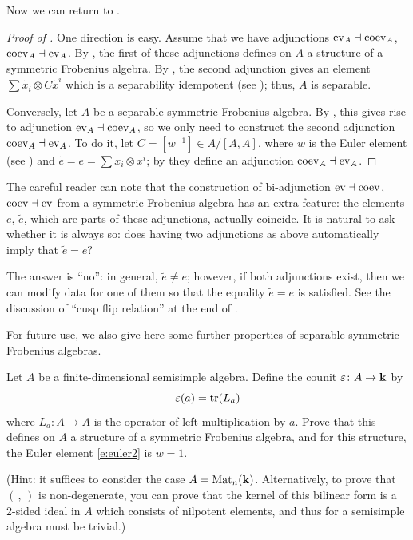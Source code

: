 Now we can return to .

\begin{proof}[Proof of ]
  One direction is easy. Assume that we have adjunctions $\operatorname{ev}_A\dashv\operatorname{coev}_A$,
  $\operatorname{coev}_A\dashv\operatorname{ev}_A$. By , the first of these
  adjunctions defines on $A$ a structure of a symmetric Frobenius algebra. By
  , the second adjunction gives an element $\sum
  \tilde x_i \otimes C\tilde x^i$ which is a separability idempotent (see
  ); thus, $A$ is separable.

  Conversely, let $A$ be a separable symmetric Frobenius algebra. By
  , this gives rise to adjunction $\operatorname{ev}_A\dashv\operatorname{coev}_A$,
  so we only need to construct the second adjunction $\operatorname{coev}_A\dashv\operatorname{ev}_A$. To do
  it, let $C=[w^{-1}]\in A/[A,A]$, where $w$ is the Euler element (see
  ) and $\tilde e=e =\sum x_i \otimes x^i$; by
   they define an adjunction $\operatorname{coev}_A\dashv
  \operatorname{ev}_A$.
\end{proof}
\begin{remark}
  The careful reader can note that the construction of bi-adjunction
  $\operatorname{ev}\dashv\operatorname{coev}$, $\operatorname{coev}\dashv\operatorname{ev}$ from a symmetric Frobenius algebra has an
  extra feature: the elements $e$, $\tilde e$, which are parts of these
  adjunctions, actually coincide. It is natural to ask whether it is always so:
  does having two adjunctions as above automatically imply that $\tilde e=e$?

  The answer is ``no'': in general, $\tilde e\ne e$; however, if both
  adjunctions exist, then we can modify data for one of them so that the equality
  $\tilde e=e$ is satisfied. See the discussion of ``cusp flip relation'' at the end
  of .
\end{remark}


For future use, we also give here some further properties of separable symmetric
Frobenius algebras.

\begin{exercise}\label{ec:standard-frobenius}
  Let $A$ be a finite-dimensional semisimple algebra. Define the counit
  $\varepsilon\colon A\to \mathbf{k}$ by
  $$
  \varepsilon(a) = \operatorname{tr}(L_a)
  $$
  where $L_a\colon A\to A$ is the operator of left multiplication by $a$.
  Prove that this defines on $A$ a structure of a symmetric Frobenius algebra,
  and for this structure, the Euler element \eqref{e:euler2} is $w=1$.

  (Hint: it suffices to consider the case $A=\operatorname{Mat}_n(\mathbf{k})$. Alternatively, to
prove that $(\, ,\, )$ is non-degenerate, you can prove that the kernel
of this bilinear form is a 2-sided ideal in $A$ which consists of
nilpotent elements, and thus for a semisimple algebra must be trivial.)
\end{exercise}



